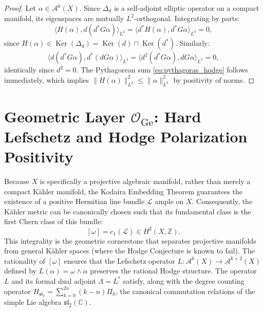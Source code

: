 \documentclass[11pt,a4paper]{article}
\theoremstyle{definition}
\theoremstyle{plain}
\DeclareMathOperator{\Ker}{Ker}
\begin{document}
\begin{proof}
Let $\alpha \in \mathcal{A}^k(X)$. Since $\Delta_d$ is a self-adjoint elliptic operator on a compact manifold, its eigenspaces are mutually $L^2$-orthogonal. Integrating by parts:
\begin{equation}
    \langle H(\alpha), d(d^* G \alpha) \rangle_{L^2} = \langle d^* H(\alpha), d^* G \alpha \rangle_{L^2} = 0,
\end{equation}
since $H(\alpha) \in \Ker(\Delta_d) = \Ker(d) \cap \Ker(d^*)$. Similarly:
\begin{equation}
    \langle d(d^* G \alpha), d^*(d G \alpha) \rangle_{L^2} = \langle d^2 (d^* G \alpha), d G \alpha \rangle_{L^2} = 0,
\end{equation}
identically since $d^2 = 0$. The Pythagorean sum \eqref{eq:pythagoras_hodge} follows immediately, which implies $\|H(\alpha)\|_{L^2}^2 \le \|\alpha\|_{L^2}^2$ by positivity of norms.
\end{proof}

\section{Geometric Layer $\mathcal{O}_{\mathrm{Ge}}$: Hard Lefschetz and Hodge Polarization Positivity}
\label{sec:geometric}

Because $X$ is specifically a projective algebraic manifold, rather than merely a compact Kähler manifold, the Kodaira Embedding Theorem guarantees the existence of a positive Hermitian line bundle $\mathcal{L}$ ample on $X$. Consequently, the Kähler metric can be canonically chosen such that its fundamental class is the first Chern class of this bundle:
\begin{equation}
    \label{eq:kodaira_polarization}
    [\omega] = c_1(\mathcal{L}) \in H^2(X, \mathbb{Z}).
\end{equation}
This integrality is the geometric cornerstone that separates projective manifolds from general Kähler spaces (where the Hodge Conjecture is known to fail). The rationality of $[\omega]$ ensures that the Lefschetz operator $L: \mathcal{A}^k(X) \to \mathcal{A}^{k+2}(X)$ defined by $L(\alpha) = \omega \wedge \alpha$ preserves the rational Hodge structure. The operator $L$ and its formal dual adjoint $\Lambda = L^*$ satisfy, along with the degree counting operator $H_{\mathfrak{sl}_2} = \sum_{k=0}^{2n} (k - n) \Pi_k$, the canonical commutation relations of the simple Lie algebra $\mathfrak{sl}_2(\mathbb{C})$.
\end{document}
